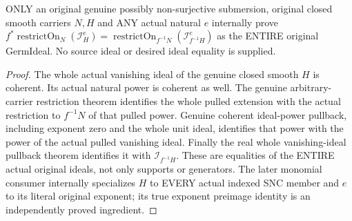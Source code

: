 \begin{theorem}
\label{hir:submersion-relative-parts-actual-powered-family}
\leanok
ONLY an original genuine possibly non-surjective submersion, original closed
smooth carriers $N,H$ and ANY actual natural $e$ internally prove
$f^*\operatorname{restrictOn}_N(\mathcal I_H^e)=
\operatorname{restrictOn}_{f^{-1}N}(\mathcal I_{f^{-1}H}^e)$ as the ENTIRE
original GermIdeal. No source ideal or desired ideal equality is supplied.
\end{theorem}
\begin{proof}
The whole actual vanishing ideal of the genuine closed smooth $H$ is coherent.
Its actual natural power is coherent as well. The genuine arbitrary-carrier
restriction theorem identifies the whole pulled extension with the actual
restriction to $f^{-1}N$ of that pulled power. Genuine coherent ideal-power
pullback, including exponent zero and the whole unit ideal, identifies that
power with the power of the actual pulled vanishing ideal. Finally the real
whole vanishing-ideal pullback theorem identifies it with $\mathcal I_{f^{-1}H}$.
These are equalities of the ENTIRE actual original ideals, not only supports
or generators. The later monomial consumer internally specializes $H$ to
EVERY actual indexed SNC member and $e$ to its literal original exponent;
its true exponent preimage identity is an independently proved ingredient.
\end{proof}

